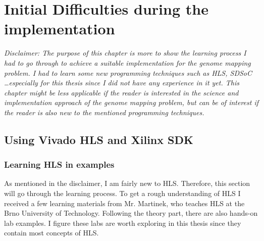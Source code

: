 
\chapter{Initial Difficulties during the implementation}
\label{ch:InitDiff}

\textit{Disclaimer: The purpose of this chapter is more to show the learning process I had to go through to achieve a suitable implementation for the genome mapping problem. I had to learn some new programming techniques such as HLS, SDSoC \dots especially for this thesis since I did not have any experience in it yet. This chapter might be less applicable if the reader is interested in the science and implementation approach of the genome mapping problem, but can be of interest if the reader is also new to the mentioned programming techniques.}

\section{Using Vivado HLS and Xilinx SDK}

\subsection{Learning HLS in examples}
\label{HLS}

As mentioned in the disclaimer, I am fairly new to HLS. Therefore, this section will go through the learning process. To get a rough understanding of HLS I received a few learning materials from Mr. Martinek, who teaches HLS at the Brno University of Technology. Following the theory part,  there are also hands-on lab examples. I figure these labs are worth exploring in this thesis since they contain most concepts of HLS.

